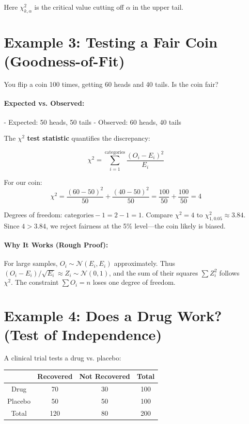 \documentclass{article}
\begin{document}
Here $\chi^2_{k,\alpha}$ is the critical value cutting off $\alpha$ in the upper tail.

\section{Example 3: Testing a Fair Coin (Goodness-of-Fit)}

You flip a coin 100 times, getting 60 heads and 40 tails. Is the coin fair?

\paragraph{Expected vs. Observed:}
- Expected: 50 heads, 50 tails
- Observed: 60 heads, 40 tails

The $\chi^2$ \textbf{test statistic} quantifies the discrepancy:

\begin{equation}
    \chi^2 = \sum_{i=1}^{\text{categories}} \frac{(O_i - E_i)^2}{E_i}
\end{equation}

For our coin:
\begin{equation}
    \chi^2 = \frac{(60-50)^2}{50} + \frac{(40-50)^2}{50} = \frac{100}{50} + \frac{100}{50} = 4
\end{equation}

Degrees of freedom: $\text{categories} - 1 = 2 - 1 = 1$. Compare $\chi^2 = 4$ to $\chi^2_{1,0.05} \approx 3.84$. Since $4 > 3.84$, we reject fairness at the 5\% level—the coin likely is biased.

\paragraph{Why It Works (Rough Proof):} For large samples, $O_i \sim \mathcal{N}(E_i, E_i)$ approximately. Thus $(O_i - E_i)/\sqrt{E_i} \approx Z_i \sim \mathcal{N}(0,1)$, and the sum of their squares $\sum Z_i^2$ follows $\chi^2$. The constraint $\sum O_i = n$ loses one degree of freedom.

\section{Example 4: Does a Drug Work? (Test of Independence)}

A clinical trial tests a drug vs. placebo:

\begin{center}
\begin{tabular}{|c|cc|c|}
\hline
 & Recovered & Not Recovered & Total \\
\hline
Drug & 70 & 30 & 100 \\
Placebo & 50 & 50 & 100 \\
\hline
Total & 120 & 80 & 200 \\
\hline
\end{tabular}
\end{center}
\end{document}
